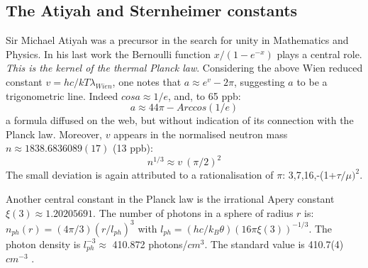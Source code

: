 \documentclass[twoside,draft]{article}
\begin{document}
\begin{sloppypar}
\subsection{The Atiyah and Sternheimer constants}
    Sir Michael Atiyah was a precursor in the search for unity in Mathematics and Physics. 
In his last work \cite{Atiyah1} the Bernoulli function $x/(1-e^{-x})$ plays a central role. \textit{This is the kernel of the thermal Planck law}. Considering the above Wien reduced constant $v = hc/kT\lambda_{Wien}$, one notes that $a \approx e^v -2\pi$, suggesting $a$ to be a trigonometric line. Indeed $cosa \approx 1/e$, and, to 65 ppb:
\begin{equation}
a \approx 44\pi - Arccos(1/e)
\end{equation}
a formula diffused on the web, but without indication of its connection with the Planck law.
Moreover, $v$ appears in the normalised neutron mass $n\approx 1838.6836089(17)$ (13 ppb):
\begin{equation}
n^{1/3}\approx v~(\pi/2)^2  
\end{equation}
The small deviation is again attributed to a rationalisation of $\pi$: 3,7,16,-(1+$\tau/\mu)^2$.

Another central constant in the Planck law is the irrational Apery constant $\xi(3) \approx 1.20205691$. The number of photons in a sphere of radius $r$ is:
$n_{ph}(r) = (4\pi/3) (r/l_{ph})^3$
with $l_{ph} = (hc/k_B \theta) (16\pi \xi(3))^{-1/3}$. The photon density is $l_{ph}^{-3} \approx $ 410.872 photons/$cm^3$. The standard value is 410.7(4) ~ $cm^{-3}$  \cite{Tanabashi}. 


\end{sloppypar}
\end{document}
